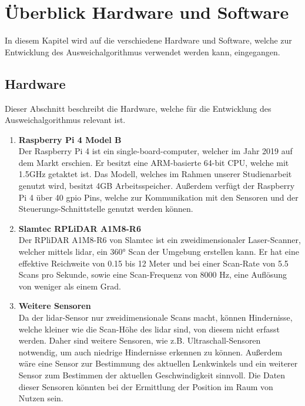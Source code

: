 \section{Überblick Hardware und Software}
In diesem Kapitel wird auf die verschiedene Hardware und Software, welche zur Entwicklung des Ausweichalgorithmus verwendet werden kann, eingegangen.

\subsection{Hardware}
Dieser Abschnitt beschreibt die Hardware, welche für die Entwicklung des Ausweichalgorithmus relevant ist. 

\begin{enumerate}
    \item \textbf{Raspberry Pi 4 Model B} \\
    Der Raspberry Pi 4 ist ein single-board-computer, welcher im Jahr 2019 auf dem Markt erschien. Er besitzt eine ARM-basierte 64-bit CPU, welche mit 1.5GHz getaktet ist. Das Modell, welches im Rahmen unserer Studienarbeit genutzt wird, besitzt 4GB Arbeitsspeicher. Außerdem verfügt der Raspberry Pi 4 über 40 \acf{gpio} Pins, welche zur Kommunikation mit den Sensoren und der Steuerungs-Schnittstelle genutzt werden können. \cite{RasPi2024}

    \item \textbf{Slamtec RPLiDAR A1M8-R6} \\
    Der RPliDAR A1M8-R6 von Slamtec ist ein zweidimensionaler Laser-Scanner, welcher mittels \acf{lidar}, ein 360° Scan der Umgebung erstellen kann. \cite[p. 3]{Slamtec2020}
    Er hat eine effektive Reichweite von 0.15 bis 12 Meter und bei einer Scan-Rate von 5.5 Scans pro Sekunde, sowie eine Scan-Frequenz von 8000 Hz, eine Auflösung von weniger als einem Grad. \cite[p. 8]{Slamtec2020}
    
    \item \textbf{Weitere Sensoren} \\
    Da der \ac{lidar}-Sensor nur zweidimensionale Scans macht, können Hindernisse, welche kleiner wie die Scan-Höhe des \ac{lidar} sind, von diesem nicht erfasst werden. Daher sind weitere Sensoren, wie z.B. Ultraschall-Sensoren notwendig, um auch niedrige Hindernisse erkennen zu können. Außerdem wäre eine Sensor zur Bestimmung des aktuellen Lenkwinkels und ein weiterer Sensor zum Bestimmen der aktuellen Geschwindigkeit sinnvoll. Die Daten dieser Sensoren könnten bei der Ermittlung der Position im Raum von Nutzen sein. 
\end{enumerate}

